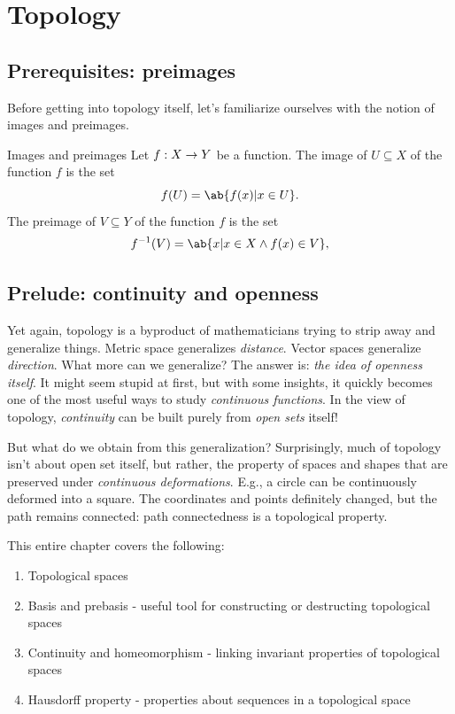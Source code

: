 \chapter{Topology}

\section{Prerequisites: preimages}

Before getting into topology itself, let's familiarize ourselves with the notion of
images and preimages.
\begin{df}{Images and preimages}{}
  Let \(f : X \rightarrow Y\) be a function. The image of \(U \subseteq X\) of the function
  \(f\) is the set
  \begin{equation}
    f(U) = \ab\{f(x) | x \in U\}.
  \end{equation}
  The preimage of \(V \subseteq Y\) of the function \(f\) is the set
  \begin{equation}
    f^{-1}(V) = \ab\{x | x \in X \land f(x) \in V\},
  \end{equation}
\end{df}

\section{Prelude: continuity and openness}

Yet again, topology is a byproduct of mathematicians trying to strip away and
generalize things. Metric space generalizes \emph{distance}. Vector spaces generalize
\emph{direction}. What more can we generalize? The answer is: \emph{the idea of openness
itself}. It might seem stupid at first, but with some insights, it quickly becomes one
of the most useful ways to study \emph{continuous functions}. In the view of topology,
\emph{continuity} can be built purely from \emph{open sets} itself!

But what do we obtain from this generalization? Surprisingly, much of topology isn't about open
set itself, but rather, the property of spaces and shapes that are preserved under \emph{continuous
deformations}. E.g., a circle can be continuously deformed into a square. The coordinates and points
definitely changed, but the path remains connected: path connectedness is a topological property.

This entire chapter covers the following:
\begin{enumerate}
  \item Topological spaces
  \item Basis and prebasis - useful tool for constructing or destructing topological spaces
  \item Continuity and homeomorphism - linking invariant properties of topological spaces
  \item Hausdorff property - properties about sequences in a topological space
\end{enumerate}

